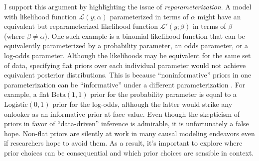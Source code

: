 \documentclass[12pt
              ]{article}
\begin{document}
\begin{itemize}
  I support this argument by highlighting the issue of \emph{reparameterization}.
  A model with likelihood function $\mathcal{L}(y; \alpha)$ parameterized in terms of $\alpha$ might have an equivalent but reparameterized likelihood function $\mathcal{L}'(y; \beta)$ in terms of $\beta$ (where $\beta \neq \alpha$).
  One such example is a binomial likelihood function that can be equivalently parameterized by a probability parameter, an odds parameter, or a log-odds parameter.
  Although the likelihoods may be equivalent for the same set of data, specifying flat priors over each individual parameter would not achieve equivalent posterior distributions.
  This is because ``noninformative'' priors in one parameterization can be ``informative'' under a different parameterization \parencite{gelman-et-al:2017:prior-likelihood}.
  For example, a flat $\mathrm{Beta}(1, 1)$ prior for the probability parameter is equal to a $\mathrm{Logistic}(0, 1)$ prior for the log-odds, although the latter would strike any onlooker as an informative prior at face value.
  Even though the skepticism of priors in favor of ``data-driven'' inference is admirable, it is unfortunately a false hope.
  Non-flat priors are silently at work in many causal modeling endeavors even if researchers hope to avoid them.
  As a result, it's important to explore where prior choices can be consequential and which prior choices are sensible in context.
\end{itemize}
\end{document}
